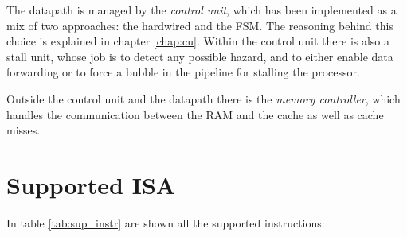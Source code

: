 The datapath is managed by the {\it control unit}, which has been implemented as a mix of two approaches: the hardwired and the FSM. The reasoning behind
this choice is explained in chapter \ref{chap:cu}. Within the control unit there is also a stall unit, whose job is to detect any possible hazard, and to
either enable data forwarding or to force a bubble in the pipeline for stalling the processor.

Outside the control unit and the datapath there is the {\it memory controller}, which handles the communication between the RAM and the cache as well as cache misses.

\section{Supported ISA}

In table \ref{tab:sup_instr} are shown all the supported instructions:


